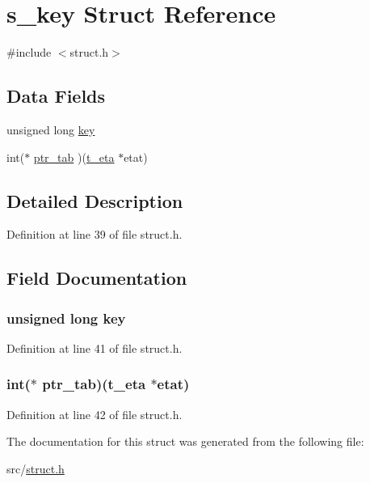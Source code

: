 \hypertarget{structs__key}{\section{s\+\_\+key Struct Reference}
\label{structs__key}
}


{\ttfamily \#include $<$struct.\+h$>$}

\subsection*{Data Fields}
\begin{DoxyCompactItemize}
\item 
unsigned long \hyperlink{structs__key_a966e5ed0946bcfca536ab5a2804aeceb}{key}
\item 
int($\ast$ \hyperlink{structs__key_aec59e854bf46ef0dfb1702af98e12335}{ptr\+\_\+tab} )(\hyperlink{struct_8h_abb3da8aaebffbf4c0c44fc37b91a41af}{t\+\_\+eta} $\ast$etat)
\end{DoxyCompactItemize}


\subsection{Detailed Description}


Definition at line 39 of file struct.\+h.



\subsection{Field Documentation}
\hypertarget{structs__key_a966e5ed0946bcfca536ab5a2804aeceb}{
\subsubsection[{key}]{\setlength{\rightskip}{0pt plus 5cm}unsigned long key}}\label{structs__key_a966e5ed0946bcfca536ab5a2804aeceb}


Definition at line 41 of file struct.\+h.

\hypertarget{structs__key_aec59e854bf46ef0dfb1702af98e12335}{
\subsubsection[{ptr\+\_\+tab}]{\setlength{\rightskip}{0pt plus 5cm}int($\ast$ ptr\+\_\+tab)({\bf t\+\_\+eta} $\ast$etat)}}\label{structs__key_aec59e854bf46ef0dfb1702af98e12335}


Definition at line 42 of file struct.\+h.



The documentation for this struct was generated from the following file\+:\begin{DoxyCompactItemize}
\item 
src/\hyperlink{struct_8h}{struct.\+h}\end{DoxyCompactItemize}
